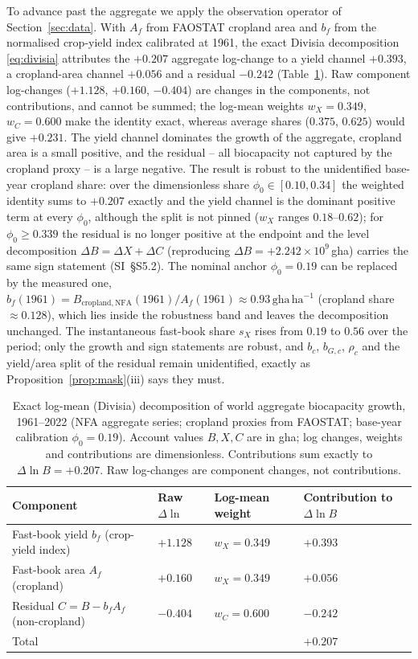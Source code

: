\documentclass[preprint,12pt,authoryear]{elsarticle}
\begin{document}
To advance past the aggregate we apply the observation operator of Section~\ref{sec:data}. With $A_f$ from FAOSTAT cropland area and $b_f$ from the normalised crop-yield index calibrated at 1961, the exact Divisia decomposition \eqref{eq:divisia} attributes the $+0.207$ aggregate log-change to a yield channel $+0.393$, a cropland-area channel $+0.056$ and a residual $-0.242$ (Table~\ref{tab:divisia}). Raw component log-changes ($+1.128$, $+0.160$, $-0.404$) are changes in the components, not contributions, and cannot be summed; the log-mean weights $w_X=0.349$, $w_C=0.600$ make the identity exact, whereas average shares ($0.375$, $0.625$) would give $+0.231$. The yield channel dominates the growth of the aggregate, cropland area is a small positive, and the residual -- all biocapacity not captured by the cropland proxy -- is a large negative. The result is robust to the unidentified base-year cropland share: over the dimensionless share $\phi_0\in[0.10,0.34]$ the weighted identity sums to $+0.207$ exactly and the yield channel is the dominant positive term at every $\phi_0$, although the split is not pinned ($w_X$ ranges $0.18$--$0.62$); for $\phi_0\ge0.339$ the residual is no longer positive at the endpoint and the level decomposition $\Delta B=\Delta X+\Delta C$ (reproducing $\Delta B=+2.242\times10^{9}$\,gha) carries the same sign statement (SI~\S S5.2). The nominal anchor $\phi_0=0.19$ can be replaced by the measured one, $b_f(1961)=B_{\mathrm{cropland,NFA}}(1961)/A_f(1961)\approx0.93\,\mathrm{gha\,ha^{-1}}$ (cropland share $\approx0.128$), which lies inside the robustness band and leaves the decomposition unchanged. The instantaneous fast-book share $s_X$ rises from $0.19$ to $0.56$ over the period; only the growth and sign statements are robust, and $b_c$, $b_{G,c}$, $\rho_c$ and the yield/area split of the residual remain unidentified, exactly as Proposition~\ref{prop:mask}(iii) says they must.

\begin{table}[!htbp]
\centering\small
\caption{Exact log-mean (Divisia) decomposition of world aggregate biocapacity growth, 1961--2022 (NFA aggregate series; cropland proxies from FAOSTAT; base-year calibration $\phi_0=0.19$). Account values $B,X,C$ are in gha; log changes, weights and contributions are dimensionless. Contributions sum exactly to $\Delta\ln B=+0.207$. Raw log-changes are component changes, not contributions.}
\label{tab:divisia}
\begin{tabularx}{\textwidth}{X l l l}
\toprule
Component & Raw $\Delta\ln$ & Log-mean weight & Contribution to $\Delta\ln B$ \\
\midrule
Fast-book yield $b_f$ (crop-yield index) & $+1.128$ & $w_X=0.349$ & $+0.393$ \\
Fast-book area $A_f$ (cropland) & $+0.160$ & $w_X=0.349$ & $+0.056$ \\
Residual $C=B-b_fA_f$ (non-cropland) & $-0.404$ & $w_C=0.600$ & $-0.242$ \\
\midrule
Total & & & $+0.207$ \\
\bottomrule
\end{tabularx}
\end{table}
\end{document}
